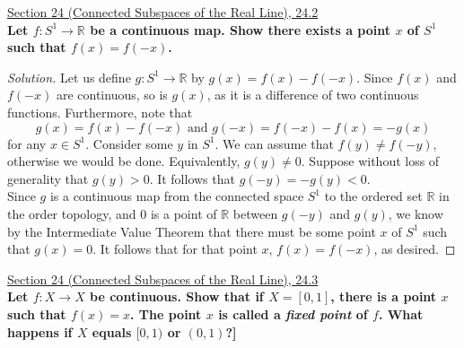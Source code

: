 \documentclass[11pt]{article}
\newcommand{\R}{\mathbb{R}}
\newenvironment{solution}
  {\renewcommand\qedsymbol{$\blacksquare$}\begin{proof}[Solution]}
  {\end{proof}}
\begin{document}
\newpage

\underline{Section 24 (Connected Subspaces of the Real Line), 24.2} \\

\textbf{Let $f \colon S^1 \rightarrow \R$ be a continuous map. Show there exists a point $x$ of $S^1$ such that $f(x) = f(-x)$.}

\begin{solution}
Let us define $g \colon S^1 \rightarrow \R$ by $g(x) = f(x) - f(-x)$. Since $f(x)$ and $f(-x)$ are continuous, so is $g(x)$, as it is a difference of two continuous functions. 
Furthermore, note that
\[
	g(x) = f(x) - f(-x) \text{ and } g(-x) = f(-x) - f(x) = -g(x)
\]
for any $x \in S^1$. Consider some $y$ in $S^1$. We can assume that $f(y) \neq f(-y)$, otherwise we would be done. 
Equivalently, $g(y) \neq 0$. Suppose without loss of generality that $g(y) > 0$. It follows that $g(-y) = -g(y) < 0$.\\

Since $g$ is a continuous map from the connected space $S^1$ to the ordered set $\R$ in the order topology, and $0$ is a point of $\R$ between $g(-y)$ and $g(y)$, we know by the Intermediate Value Theorem that there must be some point
$x$ of $S^1$ such that $g(x) = 0$. It follows that for that point $x$, $f(x) = f(-x)$, as desired.
\end{solution}

\underline{Section 24 (Connected Subspaces of the Real Line), 24.3} \\

\textbf{Let $f \colon X \rightarrow X$ be continuous. Show that if $X = [0, 1]$, there is a point $x$ such that $f(x) = x$. The point $x$ is called a \textit{fixed point} of $f$.
What happens if $X$ equals $[0, 1)$ or $(0, 1)$?]}
\end{document}
